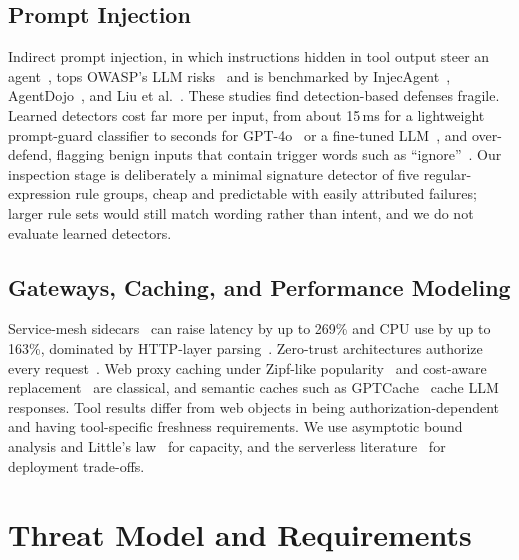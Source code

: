 \documentclass{ieeeaccess}
\newcommand{\ms}{\,ms\xspace}
\begin{document}
\subsection{Prompt Injection}
Indirect prompt injection, in which instructions hidden in tool output steer an agent~\cite{greshake2023not}, tops OWASP's LLM risks~\cite{owasp2025llm} and is benchmarked by InjecAgent~\cite{zhan2024injecagent}, AgentDojo~\cite{debenedetti2024agentdojo}, and Liu et al.~\cite{liu2024formalizing}. These studies find detection-based defenses fragile. Learned detectors cost far more per input, from about 15\ms for a lightweight prompt-guard classifier to seconds for GPT-4o~\cite{li2024injecguard} or a fine-tuned LLM~\cite{liu2025datasentinel}, and over-defend, flagging benign inputs that contain trigger words such as ``ignore''~\cite{li2024injecguard}. Our inspection stage is deliberately a minimal signature detector of five regular-expression rule groups, cheap and predictable with easily attributed failures; larger rule sets would still match wording rather than intent, and we do not evaluate learned detectors.

\subsection{Gateways, Caching, and Performance Modeling}
Service-mesh sidecars~\cite{li2019servicemesh} can raise latency by up to 269\% and CPU use by up to 163\%, dominated by HTTP-layer parsing~\cite{zhu2023dissecting}. Zero-trust architectures authorize every request~\cite{rose2020zerotrust,ward2014beyondcorp}. Web proxy caching under Zipf-like popularity~\cite{breslau1999zipf} and cost-aware replacement~\cite{cao1997cost} are classical, and semantic caches such as GPTCache~\cite{bang2023gptcache} cache LLM responses. Tool results differ from web objects in being authorization-dependent and having tool-specific freshness requirements. We use asymptotic bound analysis and Little's law~\cite{lazowska1984qsp,little1961proof} for capacity, and the serverless literature~\cite{jonas2019cloud,wang2018peeking} for deployment trade-offs.

\section{Threat Model and Requirements}
\label{sec:threat}
\end{document}

